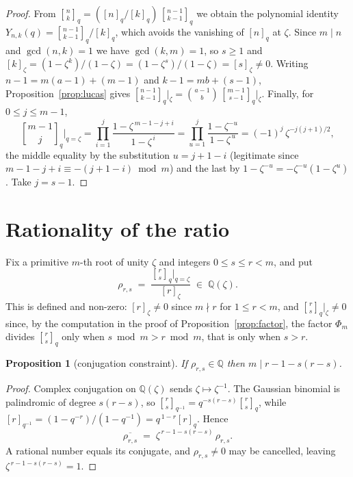\documentclass[11pt,a4paper]{article}
\theoremstyle{plain}
\newtheorem{proposition}[theorem]{Proposition}
\theoremstyle{definition}
\theoremstyle{remark}
\newcommand{\Q}{\mathbb{Q}}
\newcommand{\qint}[1]{[#1]_q}
\newcommand{\qbin}[2]{\genfrac[]{0pt}{}{#1}{#2}_{q}}
\newcommand{\qbinb}[3]{\genfrac[]{0pt}{}{#1}{#2}_{#3}}
\begin{document}
\begin{proof}
From $\qbin{n}{k}=(\qint{n}/\qint{k})\,\qbin{n-1}{k-1}$ we obtain the polynomial identity
$Y_{n,k}(q)=\qbin{n-1}{k-1}/\qint{k}$, which avoids the vanishing of $\qint{n}$ at $\zeta$.
Since $m\mid n$ and $\gcd(n,k)=1$ we have $\gcd(k,m)=1$, so $s\ge1$ and
$[k]_\zeta=(1-\zeta^{k})/(1-\zeta)=(1-\zeta^{s})/(1-\zeta)=[s]_\zeta\ne0$. Writing
$n-1=m(a-1)+(m-1)$ and $k-1=mb+(s-1)$, Proposition~\ref{prop:lucas} gives
$\qbin{n-1}{k-1}\big|_\zeta=\binom{a-1}{b}\,\qbin{m-1}{s-1}\big|_\zeta$. Finally, for
$0\le j\le m-1$,
\begin{equation}\label{eq:qbinlast}
  \qbin{m-1}{j}\Big|_{q=\zeta}
  =\prod_{i=1}^{j}\frac{1-\zeta^{\,m-1-j+i}}{1-\zeta^{\,i}}
  =\prod_{u=1}^{j}\frac{1-\zeta^{-u}}{1-\zeta^{\,u}}
  =(-1)^{j}\,\zeta^{-j(j+1)/2},
\end{equation}
the middle equality by the substitution $u=j+1-i$ (legitimate since
$m-1-j+i\equiv-(j+1-i)\bmod m$) and the last by
$1-\zeta^{-u}=-\zeta^{-u}(1-\zeta^{u})$. Take $j=s-1$.
\end{proof}

\section{Rationality of the ratio}\label{sec:rational}

Fix a primitive $m$-th root of unity $\zeta$ and integers $0\le s\le r<m$, and put
\[
  \rho_{r,s}\;=\;\frac{\qbin{r}{s}\big|_{q=\zeta}}{[r]_\zeta}\;\in\;\Q(\zeta).
\]
This is defined and non-zero: $[r]_\zeta\ne0$ since $m\nmid r$ for $1\le r<m$, and
$\qbin{r}{s}\big|_\zeta\ne0$ since, by the computation in the proof of
Proposition~\ref{prop:factor}, the factor $\Phi_m$ divides $\qbin{r}{s}$ only when
$s\bmod m>r\bmod m$, that is only when $s>r$.

\begin{proposition}[conjugation constraint]\label{prop:conj}
If $\rho_{r,s}\in\Q$ then $m\mid r-1-s(r-s)$.
\end{proposition}

\begin{proof}
Complex conjugation on $\Q(\zeta)$ sends $\zeta\mapsto\zeta^{-1}$. The Gaussian binomial is
palindromic of degree $s(r-s)$, so $\qbinb{r}{s}{q^{-1}}=q^{-s(r-s)}\qbinb{r}{s}{q}$, while
$[r]_{q^{-1}}=(1-q^{-r})/(1-q^{-1})=q^{\,1-r}[r]_{q}$. Hence
\[
  \overline{\rho_{r,s}}\;=\;\zeta^{\,r-1-s(r-s)}\,\rho_{r,s}.
\]
A rational number equals its conjugate, and $\rho_{r,s}\ne0$ may be cancelled, leaving
$\zeta^{\,r-1-s(r-s)}=1$.
\end{proof}
\end{document}
